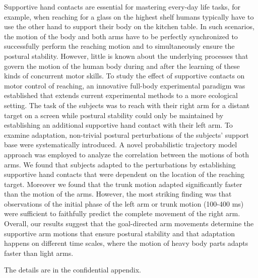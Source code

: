 

Supportive hand contacts are essential for mastering every-day life tasks, for 
example, when reaching for a glass on the highest shelf humans typically have to 
use the other hand to support their body on the kitchen table. In such 
scenarios, the motion of the body and both arms have to be perfectly 
synchronized to successfully perform the reaching motion and to simultaneously 
ensure the postural stability. However, little is known about the underlying 
processes that govern the motion of the human body during and after the learning 
of these kinds of concurrent motor skills. To study the effect of supportive 
contacts on motor control of reaching, an innovative full-body experimental 
paradigm was established that extends current experimental methods to a more 
ecological setting. The task of the subjects was to reach with their right arm 
for a distant target on a screen while postural stability could only be 
maintained by establishing an additional supportive hand contact with their left 
arm. To examine adaptation, non-trivial postural perturbations of the subjects' 
support base were systematically introduced. A novel probabilistic trajectory 
model approach was employed to analyze the correlation between the motions of 
both arms. We found that subjects adapted to the perturbations by establishing 
supportive hand contacts that were dependent on the location of the reaching 
target. Moreover we found that the trunk motion adapted significantly faster 
than the motion of the arms. However, the most striking finding was that 
observations of the initial phase of the left arm or trunk motion (100-400 ms) 
were sufficient to faithfully predict the complete movement of the right arm. 
Overall, our results suggest that the goal-directed arm movements determine the 
supportive arm motions that ensure postural stability and that adaptation 
happens on different time scales, where the motion of heavy body parts adapts 
faster than light arms. 

The details are in the confidential appendix.

